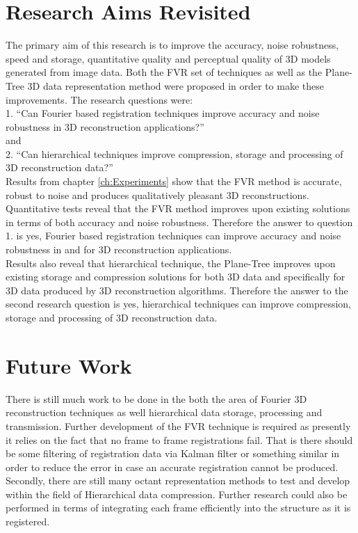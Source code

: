 \section{Research Aims Revisited}

The primary aim of this research is to improve the accuracy, noise robustness, speed and storage, quantitative quality and perceptual quality of 3D models generated from image data. Both the FVR set of techniques as well as the Plane-Tree 3D data representation method were proposed in order to make these improvements. The research questions were: \\

1. ``Can Fourier based registration techniques improve accuracy and noise robustness in 3D reconstruction applications?'' \\

and \\

2. ``Can hierarchical techniques improve compression, storage and processing of 3D reconstruction data?'' \\


Results from chapter \ref{ch:Experiments} show that the FVR method is accurate, robust to noise and produces qualitatively pleasant 3D reconstructions. Quantitative tests reveal that the FVR method improves upon existing solutions in terms of both accuracy and noise robustness. Therefore the answer to question 1. is yes, Fourier based registration techniques can improve accuracy and noise robustness in and for 3D reconstruction applications. \\


Results also reveal that hierarchical technique, the Plane-Tree improves upon existing storage and compression solutions for both 3D data and specifically for 3D data produced by 3D reconstruction algorithms. Therefore the answer to the second research question is yes, hierarchical techniques can improve compression, storage and processing of 3D reconstruction data. \\

\section{Future Work}

There is still much work to be done in the both the area of Fourier 3D reconstruction techniques as well hierarchical data storage, processing and transmission. Further development of the FVR technique is required as presently it relies on the fact that no frame to frame registrations fail. That is there should be some filtering of registration data via Kalman filter or something similar in order to reduce the error in case an accurate registration cannot be produced. Secondly, there are still many octant representation methods to test and develop within the field of Hierarchical data compression. Further research could also be performed in terms of integrating each frame efficiently into the structure as it is registered. \\
